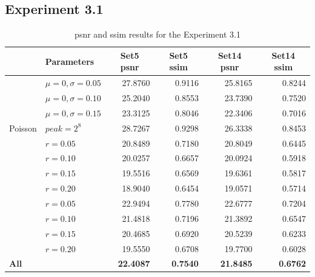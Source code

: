 \subsection{Experiment 3.1}
\begin{table}[]
	\centering
	\begin{tabular}{|l|l|r|r|r|r|}
		\hline
		\rowcolor[HTML]{EFEFEF} 
		\multicolumn{1}{|c|}{\cellcolor[HTML]{EFEFEF}\textbf{Noise}} & \textbf{Parameters} & \multicolumn{1}{c|}{\cellcolor[HTML]{EFEFEF}\textbf{Set5 \gls{psnr}}} & \multicolumn{1}{c|}{\cellcolor[HTML]{EFEFEF}\textbf{Set5 \gls{ssim}}} & \multicolumn{1}{c|}{\cellcolor[HTML]{EFEFEF}\textbf{Set14 \gls{psnr}}} & \multicolumn{1}{c|}{\cellcolor[HTML]{EFEFEF}\textbf{Set14 \gls{ssim}}} \\ \hline
		\rowcolor[HTML]{FFFFFF} 
		\cellcolor[HTML]{EFEFEF} & $\mu=0, \sigma=0.05$ & 27.8760 & 0.9116 & 25.8165 & 0.8244 \\
		\rowcolor[HTML]{EFEFEF} 
		\cellcolor[HTML]{EFEFEF} & $\mu=0, \sigma=0.10$ & 25.2040 & 0.8553 & 23.7390 & 0.7520 \\
		\rowcolor[HTML]{FFFFFF} 
		\multirow{-3}{*}{\cellcolor[HTML]{EFEFEF}Gaussian} & $\mu=0, \sigma=0.15$ & 23.3125 & 0.8046 & 22.3406 & 0.7016 \\
		\rowcolor[HTML]{EFEFEF} 
		Poisson & $peak=2^8$ & 28.7267 & 0.9298 & 26.3338 & 0.8453 \\
		\rowcolor[HTML]{FFFFFF} 
		\cellcolor[HTML]{EFEFEF} & $r=0.05$ & 20.8489 & 0.7180 & 20.8049 & 0.6445 \\
		\rowcolor[HTML]{EFEFEF} 
		\cellcolor[HTML]{EFEFEF} & $r=0.10$ & 20.0257 & 0.6657 & 20.0924 & 0.5918 \\
		\rowcolor[HTML]{FFFFFF} 
		\cellcolor[HTML]{EFEFEF} & $r=0.15$ & 19.5516 & 0.6569 & 19.6361 & 0.5817 \\
		\rowcolor[HTML]{EFEFEF} 
		\multirow{-4}{*}{\cellcolor[HTML]{EFEFEF}Salt-and-pepper} & $r=0.20$ & 18.9040 & 0.6454 & 19.0571 & 0.5714 \\
		\rowcolor[HTML]{FFFFFF} 
		\cellcolor[HTML]{EFEFEF} & $r=0.05$ & 22.9494 & 0.7780 & 22.6777 & 0.7204 \\
		\rowcolor[HTML]{EFEFEF} 
		\cellcolor[HTML]{EFEFEF} & $r=0.10$ & 21.4818 & 0.7196 & 21.3892 & 0.6547 \\
		\rowcolor[HTML]{FFFFFF} 
		\cellcolor[HTML]{EFEFEF} & $r=0.15$ & 20.4685 & 0.6920 & 20.5239 & 0.6233 \\
		\rowcolor[HTML]{EFEFEF} 
		\multirow{-4}{*}{\cellcolor[HTML]{EFEFEF}Uniform} & $r=0.20$ & 19.5550 & 0.6708 & 19.7700 & 0.6028 \\
		\rowcolor[HTML]{FFFFFF} 
		\textbf{All} &  & \textbf{22.4087} & \textbf{0.7540} & \textbf{21.8485} & \textbf{0.6762}\\\hline
	\end{tabular}
	\caption{\gls{psnr} and \gls{ssim} results for the Experiment 3.1}
	\label{tab:experiment31}
\end{table}

